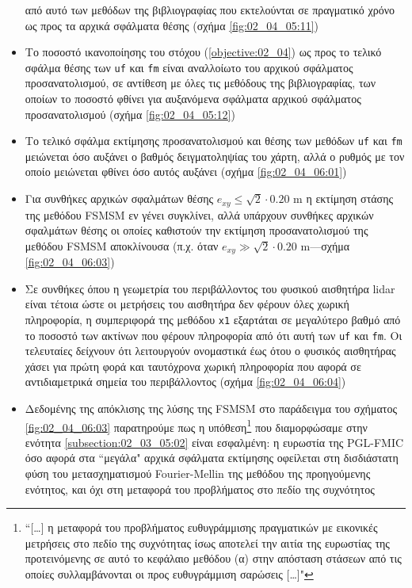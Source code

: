 \begin{itemize}
        από αυτό των μεθόδων της βιβλιογραφίας που εκτελούνται σε πραγματικό
        χρόνο ως προς τα αρχικά σφάλματα θέσης (σχήμα \ref{fig:02_04_05:11})
  \item Το ποσοστό ικανοποίησης του στόχου (\ref{objective:02_04}) ως προς
        το τελικό σφάλμα θέσης των \texttt{uf} και \texttt{fm} είναι αναλλοίωτο
        του αρχικού σφάλματος προσανατολισμού, σε αντίθεση με όλες τις μεθόδους
        της βιβλιογραφίας, των οποίων το ποσοστό φθίνει για αυξανόμενα σφάλματα
        αρχικού σφάλματος προσανατολισμού (σχήμα \ref{fig:02_04_05:12})
  \item Το τελικό σφάλμα εκτίμησης προσανατολισμού και θέσης των μεθόδων
        \texttt{uf} και \texttt{fm} μειώνεται όσο αυξάνει ο βαθμός
        δειγματοληψίας του χάρτη, αλλά ο ρυθμός με τον οποίο μειώνεται φθίνει
        όσο αυτός αυξάνει (σχήμα \ref{fig:02_04_06:01})
  \item Για συνθήκες αρχικών σφαλμάτων θέσης $e_{xy} \leq \sqrt{2}\cdot 0.20$ m
        η εκτίμηση στάσης της μεθόδου FSMSM εν γένει συγκλίνει, αλλά υπάρχουν
        συνθήκες αρχικών σφαλμάτων θέσης οι οποίες καθιστούν την εκτίμηση
        προσανατολισμού της μεθόδου FSMSM αποκλίνουσα (π.χ.  όταν $e_{xy} \gg
        \sqrt{2}\cdot 0.20$ m---σχήμα \ref{fig:02_04_06:03})
  \item Σε συνθήκες όπου η γεωμετρία του περιβάλλοντος του φυσικού αισθητήρα
        lidar είναι τέτοια ώστε οι μετρήσεις του αισθητήρα δεν φέρουν όλες
        χωρική πληροφορία, η συμπεριφορά της μεθόδου \texttt{x1} εξαρτάται
        σε μεγαλύτερο βαθμό από το ποσοστό των ακτίνων που φέρουν πληροφορία
        από ότι αυτή των \texttt{uf} και \texttt{fm}. Οι τελευταίες δείχνουν
        ότι λειτουργούν ονομαστικά έως ότου ο φυσικός αισθητήρας χάσει για
        πρώτη φορά και ταυτόχρονα χωρική πληροφορία που αφορά σε αντιδιαμετρικά
        σημεία του περιβάλλοντος (σχήμα \ref{fig:02_04_06:04})
  \item Δεδομένης της απόκλισης της λύσης της FSMSM στο παράδειγμα του σχήματος
        \ref{fig:02_04_06:03} παρατηρούμε πως η υπόθεση\footnote{``[\dots] η
        μεταφορά του προβλήματος ευθυγράμμισης πραγματικών με εικονικές
        μετρήσεις στο πεδίο της συχνότητας ίσως αποτελεί την αιτία της
        ευρωστίας της προτεινόμενης σε αυτό το κεφάλαιο μεθόδου (α) στην
        απόσταση στάσεων από τις οποίες συλλαμβάνονται οι προς ευθυγράμμιση
        σαρώσεις [\dots]"} που διαμορφώσαμε στην ενότητα
        \ref{subsection:02_03_05:02} είναι εσφαλμένη: η ευρωστία της PGL-FMIC
        όσο αφορά στα ``μεγάλα" αρχικά σφάλματα εκτίμησης οφείλεται στη
        δισδιάστατη φύση του μετασχηματισμού Fourier-Mellin της μεθόδου της
        προηγούμενης ενότητος, και όχι στη μεταφορά του προβλήματος στο πεδίο
        της συχνότητος
\end{itemize}


